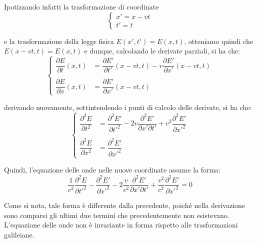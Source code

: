 Ipotizzando infatti la trasformazione di coordinate
\begin{equation}
\left\{\begin{array}{ll}
x' = x - vt \\
t' = t
\end{array}\right.
\end{equation}

e la trasformazione della legge fisica $E (x', t') = E(x, t)$, otteniamo quindi che
$E (x - vt, t) = E(x, t)$ e dunque, calcolando le derivate parziali, si ha che:
\begin{equation}
 \left\{\begin{array}{ll}
  \dfrac{\partial E}{\partial t}(x,t) &= \dfrac{\partial E'}{\partial t'}(x-vt, t) - v \dfrac{\partial E'}{\partial x'}(x-vt,t) \\
  & \\
  \dfrac{\partial E}{\partial x}(x,t) &= \dfrac{\partial E'}{\partial x'}(x-vt, t)
 \end{array}\right.
\end{equation}

derivando nuovamente, sottintendendo i punti di calcolo delle derivate, si ha che:
\begin{equation}
 \left\{\begin{array}{ll}
  \dfrac{\partial^2 E}{\partial t^2} &= \dfrac{\partial^2 E'}{\partial t'^2} - 2v \dfrac{\partial^2 E'}{\partial x' \partial t'} + v^2  \dfrac{\partial^2 E'}{\partial x'^2} \\
  & \\
  \dfrac{\partial^2 E}{\partial x^2} &= \dfrac{\partial^2 E'}{\partial x'^2}
 \end{array}\right.
\end{equation}

Quindi, l'equazione delle onde nelle nuove coordinate assume la forma:
\begin{equation}
  \dfrac{1}{c^2}\dfrac{\partial^2 E}{\partial t'^2} - \dfrac{\partial^2 E'}{\partial x'^2} 
 - 2\dfrac{v}{c^2} \dfrac{\partial^2 E'}{\partial x' \partial t'} + \dfrac{v^2}{c^2}\dfrac{\partial^2 E'}{\partial x'^2} = 0
\end{equation}

Come si nota, tale forma è differente dalla precedente, poiché nella derivazione 
sono comparsi gli ultimi due termini che precedentemente non esistevano. 
L'equazione delle onde non è invariante in forma rispetto alle trasformazioni galileiane.